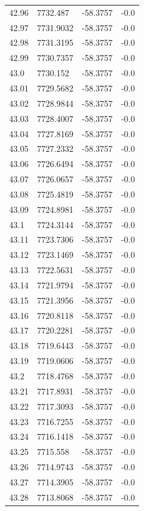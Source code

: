 \begin{table}[H]
\begin{tabular}{llll}
42.96 & 7732.487 & -58.3757 & -0.0 \\
42.97 & 7731.9032 & -58.3757 & -0.0 \\
42.98 & 7731.3195 & -58.3757 & -0.0 \\
42.99 & 7730.7357 & -58.3757 & -0.0 \\
43.0 & 7730.152 & -58.3757 & -0.0 \\
43.01 & 7729.5682 & -58.3757 & -0.0 \\
43.02 & 7728.9844 & -58.3757 & -0.0 \\
43.03 & 7728.4007 & -58.3757 & -0.0 \\
43.04 & 7727.8169 & -58.3757 & -0.0 \\
43.05 & 7727.2332 & -58.3757 & -0.0 \\
43.06 & 7726.6494 & -58.3757 & -0.0 \\
43.07 & 7726.0657 & -58.3757 & -0.0 \\
43.08 & 7725.4819 & -58.3757 & -0.0 \\
43.09 & 7724.8981 & -58.3757 & -0.0 \\
43.1 & 7724.3144 & -58.3757 & -0.0 \\
43.11 & 7723.7306 & -58.3757 & -0.0 \\
43.12 & 7723.1469 & -58.3757 & -0.0 \\
43.13 & 7722.5631 & -58.3757 & -0.0 \\
43.14 & 7721.9794 & -58.3757 & -0.0 \\
43.15 & 7721.3956 & -58.3757 & -0.0 \\
43.16 & 7720.8118 & -58.3757 & -0.0 \\
43.17 & 7720.2281 & -58.3757 & -0.0 \\
43.18 & 7719.6443 & -58.3757 & -0.0 \\
43.19 & 7719.0606 & -58.3757 & -0.0 \\
43.2 & 7718.4768 & -58.3757 & -0.0 \\
43.21 & 7717.8931 & -58.3757 & -0.0 \\
43.22 & 7717.3093 & -58.3757 & -0.0 \\
43.23 & 7716.7255 & -58.3757 & -0.0 \\
43.24 & 7716.1418 & -58.3757 & -0.0 \\
43.25 & 7715.558 & -58.3757 & -0.0 \\
43.26 & 7714.9743 & -58.3757 & -0.0 \\
43.27 & 7714.3905 & -58.3757 & -0.0 \\
43.28 & 7713.8068 & -58.3757 & -0.0 \\

\end{tabular}
\end{table}
